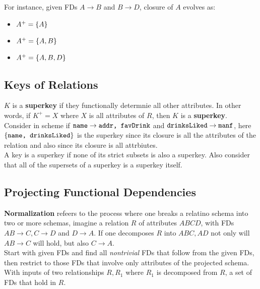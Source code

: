 \documentclass[11pt,a4paper,twocolumn]{book}
\begin{document}
For instance, given FDs $A \to B$ and $B \to D$, closure of $A$ evolves as:

\begin{itemize}
\item $A^+ = \{ A \}$
\item $A^+ = \{ A, B \}$
\item $A^+ = \{ A, B, D \}$
\end{itemize}

\subsection{Keys of Relations}

$K$ is a \textbf{superkey} if they functionally determnie all other attributes. In other words, if $K^+ = X$ where $X$ is all attributes of $R$, then $K$ is a \textbf{superkey}.\\

Consider in scheme  if $\texttt{name} \to \texttt{addr, favDrink}$ and $\texttt{drinksLiked} \to \texttt{manf}$, here $\{ \texttt{name, drinksLiked} \}$ is the superkey since its closure is all the attributes of the relation and also since its closure is all attrbiutes.\\

A key is a superkey if none of its strict subsets is also a superkey. Also consider that all of the supersets of a superkey is a superkey itself.\\

\subsection{Projecting Functional Dependencies}

\textbf{Normalization} refeers to the process where one breaks a relatino schema into two or more schemas, imagine a relation $R$ of attributes $ABCD$, with FDs $AB \to C, C \to D$ and $D \to A$. If one decomposes $R$ into $ABC, AD$ not only will $AB \to C$ will hold, but also $C \to A$.\\

Start with given FDs and find all \textit{nontrivial} FDs that follow from the given FDs, then restrict to those FDs that involve only attributes of the projected schema.\\

With inputs of two relationships $R, R_1$ where $R_1$ is decomposed from $R$, a set of FDs that hold in $R$.
\end{document}
